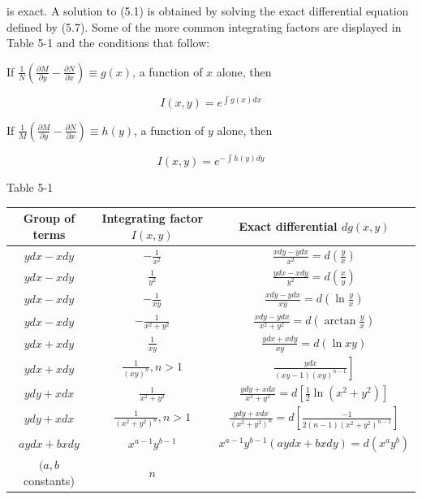 \documentclass[10pt]{article}
\begin{document}
is exact. A solution to (5.1) is obtained by solving the exact differential equation defined by (5.7). Some of the more common integrating factors are displayed in Table 5-1 and the conditions that follow:

If $\frac{1}{N}\left(\frac{\partial M}{\partial y}-\frac{\partial N}{\partial x}\right) \equiv g(x)$, a function of $x$ alone, then


\begin{equation*}
I(x, y)=e^{\int g(x) d x} \tag{5.8}
\end{equation*}


If $\frac{1}{M}\left(\frac{\partial M}{\partial y}-\frac{\partial N}{\partial x}\right) \equiv h(y)$, a function of $y$ alone, then


\begin{equation*}
I(x, y)=e^{-\int h(y) d y} \tag{5.9}
\end{equation*}


Table 5-1

\begin{center}
\begin{tabular}{|c|c|c|}
\hline
Group of terms & Integrating factor $I(x, y)$ & Exact differential $d g(x, y)$ \\
\hline
$y d x-x d y$ & $-\frac{1}{x^{2}}$ & $\frac{x d y-y d x}{x^{2}}=d\left(\frac{y}{x}\right)$ \\
\hline
$y d x-x d y$ & $\frac{1}{y^{2}}$ & $\frac{y d x-x d y}{y^{2}}=d\left(\frac{x}{y}\right)$ \\
\hline
$y d x-x d y$ & $-\frac{1}{x y}$ & $\frac{x d y-y d x}{x y}=d\left(\ln \frac{y}{x}\right)$ \\
\hline
$y d x-x d y$ & $-\frac{1}{x^{2}+y^{2}}$ & $\frac{x d y-y d x}{x^{2}+y^{2}}=d\left(\arctan \frac{y}{x}\right)$ \\
\hline
$y d x+x d y$ & $\frac{1}{x y}$ & $\frac{y d x+x d y}{x y}=d(\ln x y)$ \\
\hline
$y d x+x d y$ & $\frac{1}{(x y)^{n}}, n>1$ & $\left.\frac{y d x}{(x y-1)(x y)^{n-1}}\right]$ \\
\hline
$y d y+x d x$ & $\frac{1}{x^{2}+y^{2}}$ & $\frac{y d y+x d x}{x^{2}+y^{2}}=d\left[\frac{1}{2} \ln \left(x^{2}+y^{2}\right)\right]$ \\
\hline
$y d y+x d x$ & $\frac{1}{\left(x^{2}+y^{2}\right)^{n}}, n>1$ & $\frac{y d y+x d x}{\left(x^{2}+y^{2}\right)^{n}}=d\left[\frac{-1}{2(n-1)\left(x^{2}+y^{2}\right)^{n-1}}\right]$ \\
\hline
$a y d x+b x d y$ & $x^{a-1} y^{b-1}$ & $x^{a-1} y^{b-1}(a y d x+b x d y)=d\left(x^{a} y^{b}\right)$ \\
\hline
$(a, b$ constants) & $n$ &  \\
\hline
\end{tabular}
\end{center}
\end{document}
